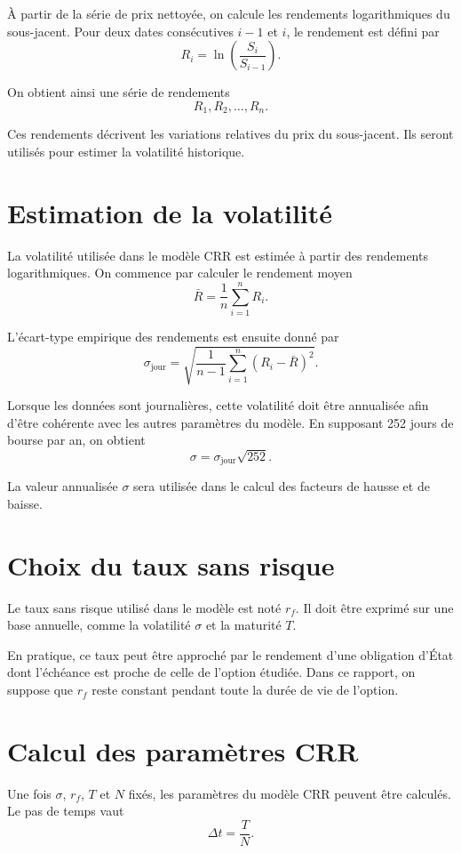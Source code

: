 \documentclass[12pt,a4paper]{report}
\begin{document}
À partir de la série de prix nettoyée, on calcule les rendements logarithmiques du sous-jacent. Pour deux dates consécutives $i-1$ et $i$, le rendement est défini par
\[
R_i = \ln\left(\frac{S_i}{S_{i-1}}\right).
\]

On obtient ainsi une série de rendements
\[
R_1, R_2, \ldots, R_n.
\]

Ces rendements décrivent les variations relatives du prix du sous-jacent. Ils seront utilisés pour estimer la volatilité historique.

\section{Estimation de la volatilité}

La volatilité utilisée dans le modèle CRR est estimée à partir des rendements logarithmiques. On commence par calculer le rendement moyen
\[
\bar{R} = \frac{1}{n}\sum_{i=1}^{n} R_i.
\]

L'écart-type empirique des rendements est ensuite donné par
\[
\sigma_{\text{jour}} =
\sqrt{
\frac{1}{n-1}
\sum_{i=1}^{n}
(R_i - \bar{R})^2
}.
\]

Lorsque les données sont journalières, cette volatilité doit être annualisée afin d'être cohérente avec les autres paramètres du modèle. En supposant 252 jours de bourse par an, on obtient
\[
\sigma = \sigma_{\text{jour}}\sqrt{252}.
\]

La valeur annualisée $\sigma$ sera utilisée dans le calcul des facteurs de hausse et de baisse.

\section{Choix du taux sans risque}

Le taux sans risque utilisé dans le modèle est noté $r_f$. Il doit être exprimé sur une base annuelle, comme la volatilité $\sigma$ et la maturité $T$.

En pratique, ce taux peut être approché par le rendement d'une obligation d'État dont l'échéance est proche de celle de l'option étudiée. Dans ce rapport, on suppose que $r_f$ reste constant pendant toute la durée de vie de l'option.

\section{Calcul des paramètres CRR}

Une fois $\sigma$, $r_f$, $T$ et $N$ fixés, les paramètres du modèle CRR peuvent être calculés. Le pas de temps vaut
\[
\Delta t = \frac{T}{N}.
\]
\end{document}
